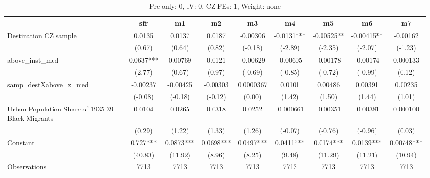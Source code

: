 \begin{table}[htbp]\centering
\def\sym#1{\ifmmode^{#1}\else\(^{#1}\)\fi}
\caption{Pre only: 0, IV: 0, CZ FEs: 1, Weight: none}
\begin{tabular}{l*{8}{c}}
\toprule
                    &\multicolumn{1}{c}{sfr}&\multicolumn{1}{c}{m1}&\multicolumn{1}{c}{m2}&\multicolumn{1}{c}{m3}&\multicolumn{1}{c}{m4}&\multicolumn{1}{c}{m5}&\multicolumn{1}{c}{m6}&\multicolumn{1}{c}{m7}\\
\midrule
Destination CZ sample&      0.0135   &      0.0137   &      0.0187   &    -0.00306   &     -0.0131***&    -0.00525** &    -0.00415** &    -0.00162   \\
                    &      (0.67)   &      (0.64)   &      (0.82)   &     (-0.18)   &     (-2.89)   &     (-2.35)   &     (-2.07)   &     (-1.23)   \\
\addlinespace
above\_inst\_med      &      0.0637***&     0.00769   &      0.0121   &    -0.00629   &    -0.00605   &    -0.00178   &    -0.00174   &    0.000133   \\
                    &      (2.77)   &      (0.67)   &      (0.97)   &     (-0.69)   &     (-0.85)   &     (-0.72)   &     (-0.99)   &      (0.12)   \\
\addlinespace
samp\_destXabove\_z\_med&    -0.00237   &    -0.00425   &    -0.00303   &   0.0000367   &      0.0101   &     0.00486   &     0.00391   &     0.00235   \\
                    &     (-0.08)   &     (-0.18)   &     (-0.12)   &      (0.00)   &      (1.42)   &      (1.50)   &      (1.44)   &      (1.01)   \\
\addlinespace
Urban Population Share of 1935-39 Black Migrants&      0.0104   &      0.0265   &      0.0318   &      0.0252   &   -0.000661   &    -0.00351   &    -0.00381   &    0.000100   \\
                    &      (0.29)   &      (1.22)   &      (1.33)   &      (1.26)   &     (-0.07)   &     (-0.76)   &     (-0.96)   &      (0.03)   \\
\addlinespace
Constant            &       0.727***&      0.0873***&      0.0698***&      0.0497***&      0.0411***&      0.0174***&      0.0139***&     0.00748***\\
                    &     (40.83)   &     (11.92)   &      (8.96)   &      (8.25)   &      (9.48)   &     (11.29)   &     (11.21)   &     (10.94)   \\
\midrule
Observations        &        7713   &        7713   &        7713   &        7713   &        7713   &        7713   &        7713   &        7713   \\

\end{tabular}
\end{table}
